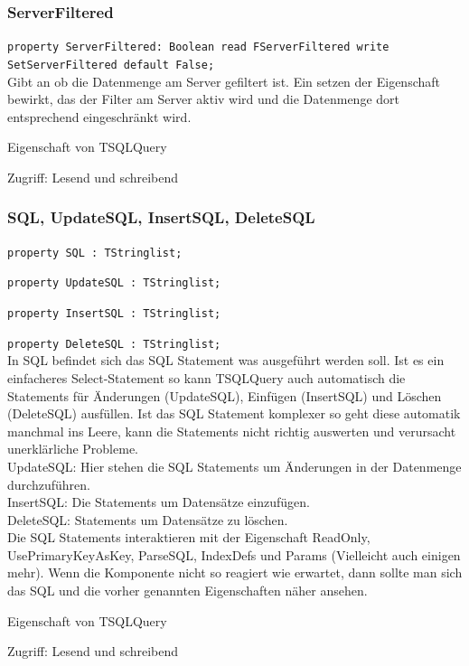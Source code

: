 \subsubsection{ServerFiltered}
\begin{description}
  \item \texttt{property ServerFiltered: Boolean read FServer\-Filtered write Set\-Server\-Filtered default False;}\\Gibt an ob die Datenmenge am Server gefiltert ist. Ein setzen der Eigenschaft bewirkt, das der Filter am Server aktiv wird und die Datenmenge dort entsprechend eingeschränkt wird. 
  \begin{description}
    \item Eigenschaft von TSQLQuery
  \end{description}
  \begin{description}
    \item Zugriff: Lesend und schreibend
  \end{description}
\end{description}

\subsubsection{SQL, UpdateSQL, InsertSQL, DeleteSQL}
\begin{description}
  \item \texttt{property SQL : TStringlist;}
  \item \texttt{property UpdateSQL : TStringlist;}
  \item \texttt{property InsertSQL : TStringlist;}
  \item \texttt{property DeleteSQL : TStringlist;}\\In SQL befindet sich das SQL Statement was ausgeführt werden soll. Ist es ein einfacheres Select-Statement so kann TSQLQuery auch automatisch die Statements für Änderungen (UpdateSQL), Einfügen (InsertSQL) und Löschen (DeleteSQL) ausfüllen. Ist das SQL Statement komplexer so geht diese automatik manchmal ins Leere, kann die Statements nicht richtig auswerten und verursacht unerklärliche Probleme.\\
UpdateSQL: Hier stehen die SQL Statements um Änderungen in der Datenmenge durchzuführen.\\
InsertSQL: Die Statements um Datensätze einzufügen.\\
DeleteSQL: Statements um Datensätze zu löschen.\\
Die SQL Statements interaktieren mit der Eigenschaft ReadOnly, UsePrimaryKeyAsKey, ParseSQL, IndexDefs und Params (Vielleicht auch einigen mehr). Wenn die Komponente nicht so reagiert wie erwartet, dann sollte man sich das SQL und die vorher genannten Eigenschaften näher ansehen.
  \begin{description}
    \item Eigenschaft von TSQLQuery
  \end{description}
  \begin{description}
    \item Zugriff: Lesend und schreibend
  \end{description}
\end{description}

